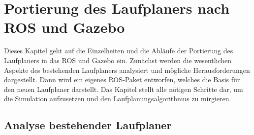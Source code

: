 \chapter{Portierung des Laufplaners nach ROS und Gazebo}
\label{kap4}

Dieses Kapitel geht auf die Einzelheiten und die Abläufe der Portierung des Laufplaners in das \acf{ROS} und Gazebo ein. Zunächst werden die wesentlichen Aspekte des bestehenden Laufplaners analysiert und mögliche Herausforderungen dargestellt. Dann wird ein eigenes \ac{ROS}-Paket entworfen, welches die Basis für den neuen Laufplaner darstellt. Das Kapitel stellt alle nötigen Schritte dar, um die Simulation aufzusetzen und den Laufplanungsalgorithmus zu mirgieren.

\section{Analyse bestehender Laufplaner}

